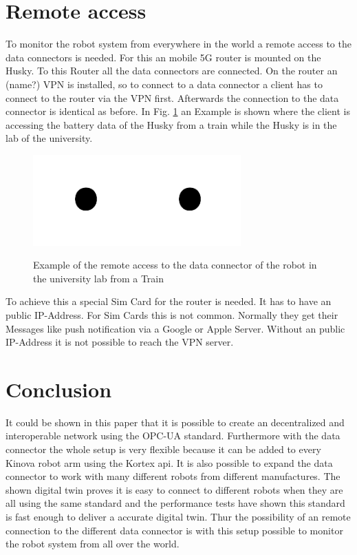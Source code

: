 \documentclass[conference]{IEEEtran}
\begin{document}
\section{Remote access}
To monitor the robot system from everywhere in the world a remote access to the data connectors is needed.
For this an mobile 5G router is mounted on the Husky. To this Router all the data connectors are connected.
On the router an (name?) VPN is installed, so to connect to a data connector a client has to connect to the router via the VPN first.
Afterwards the connection to the data connector is identical as before.
In Fig. \ref{fig:RemoteAccess} an Example is shown where the client is accessing the battery data of the Husky from a train while the Husky is in the lab of the university.
\begin{figure}[htbp]
    \centerline{\includegraphics[width=4cm]{Pictures/fig1.png}\includegraphics[width=4cm]{Pictures/fig1.png}}
    \caption{Example of the remote access to the data connector of the robot in the university lab from a Train}
    \label{fig:RemoteAccess}
\end{figure}
To achieve this a special Sim Card for the router is needed.
It has to have an public IP-Address. For Sim Cards this is not common.
Normally they get their Messages like push notification via a Google or Apple Server.
Without an public IP-Address it is not possible to reach the VPN server.
\section{Conclusion}
It could be shown in this paper that it is possible to create an decentralized and interoperable network using the OPC-UA standard.
Furthermore with the data connector the whole setup is very flexible because it can be added to every Kinova robot arm using the Kortex api.
It is also possible to expand the data connector to work with many different robots from different manufactures.
The shown digital twin proves it is easy to connect to different robots when they are all using the same standard and the performance tests have shown this standard is fast enough to deliver a accurate digital twin.
Thur the possibility of an remote connection to the different data connector is with this setup possible to monitor the robot system from all over the world.
\end{document}
